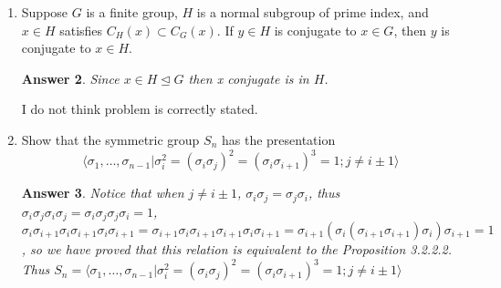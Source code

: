 \documentclass[11pt,leqno]{article}
\newcommand{\<}[1]{{\langle}#1 {\rangle}}
\theoremstyle{plain}
\newtheorem*{answer*}{Answer}
\theoremstyle{definition}
\theoremstyle{remark}
\numberwithin{equation}{section}
\begin{document}
\begin{enumerate}
\begin{answer*}
     ii) Burnside Lemma gives that $|G|=\sum_{g\in G} X^g$, suppose all elements fix some $x\in X$, we notice $X^e \geq 2$, then we have $|G|=\sum_{g\in G} X^g > |G|$. 
      
     iii) We see $X=\{(g_1,g_2) \in G | [g_1,g_2] = e\}$, then $g*(g_1,g_2)=(gg_1g^{-1},gg_2g^{-1})$, while $gg_1g^{-1}gg_2g^{-1}=gg_1g_2g^{-1}=gg_2g_1g^{-1}=gg_2g^{-1},gg_1g^{-1}$, that is,$ [gg_1g^{-1},gg_2g^{-1}] = e\}$, the converse calculation shows $X$ is exactly the fixed-point locus by all $g$. This eventually translates to number of $G$-conjugating orbits times $|G|$ is number of $G$-fixed points.
     
     iv) the number is equal to $|G|$ times the number of conjugacy classes in $G$.
    \end{answer*}
    

\item Suppose $G$ is a finite group, $H$ is a normal subgroup of prime index, and $x \in H$ satisfies $C_H(x) \subset C_G(x)$. If $y \in H$ is conjugate to $x \in G$, then $y$ is conjugate to $x \in H$.
    \begin{answer*}
    Since $x\in H \trianglelefteq G$ then x conjugate is in $H$.
    \end{answer*} I do not think problem is correctly stated.


\item Show that the symmetric group $S_n$ has the presentation
    \[
    \langle \sigma_1,\ldots,\sigma_{n-1} | \sigma_i^2 = (\sigma_i \sigma_j)^2 = (\sigma_i \sigma_{i+1})^3 = 1; j \neq i\pm 1 \rangle
    \]
    \begin{answer*}
    Notice that when $ j\neq i\pm 1$,  $\sigma_i\sigma_j=\sigma_j\sigma_i$, thus $\sigma_i\sigma_j\sigma_i\sigma_j=\sigma_i\sigma_j\sigma_j\sigma_i=1$, 
    $\sigma_i\sigma_{i+1}\sigma_i\sigma_{i+1}\sigma_i\sigma_{i+1}=\sigma_{i+1}\sigma_{i}\sigma_{i+1}\sigma_{i+1}\sigma_i\sigma_{i+1}=\sigma_{i+1}(\sigma_{i}(\sigma_{i+1}\sigma_{i+1})\sigma_i)\sigma_{i+1}=1$, so we have proved that this relation is equivalent to the Proposition 3.2.2.2. Thus  $S_n=\langle \sigma_1,\ldots,\sigma_{n-1} | \sigma_i^2 = (\sigma_i \sigma_j)^2 = (\sigma_i \sigma_{i+1})^3 = 1; j \neq i\pm 1 \rangle $
    \end{answer*}
    
    
\end{enumerate}
\end{document}
